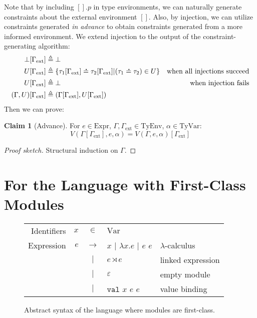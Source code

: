 \documentclass{article}
\theoremstyle{definition}
\newtheorem{clm}{Claim}[section]
\newcommand*{\vbar}{|}
\newcommand*{\A}[1]{\overset{\,_{\mbox{\Large .}}}{#1}}
\newcommand*{\Expr}{\text{Expr}}
\newcommand*{\ExprVar}{\text{Var}}
\newcommand*{\link}[2]{{#1}\rtimes{#2}}
\newcommand*{\Lete}{\mathtt{val}}
\newcommand*{\TyEnv}{\text{TyEnv}}
\newcommand*{\TyVar}{\text{TyVar}}
\newcommand*{\external}{\Gamma_{\text{ext}}}
\begin{document}
Note that by including $[].p$ in type environments, we can naturally generate constraints about the external environment $[]$.
Also, by injection, we can utilize constraints generated \emph{in advance} to obtain constraints generated from a more informed environment.
We extend injection to the output of the constraint-generating algorithm:
\begin{align*}
  \bot[\external]       & \triangleq\bot                                                                                                      \\
  U[\external]          & \triangleq\{\tau_1[\external]\A{=}\tau_2[\external]|(\tau_1\A{=}\tau_2)\in U\} & \text{when all injections succeed} \\
  U[\external]          & \triangleq\bot                                                                 & \text{when injection fails}        \\
  (\Gamma,U)[\external] & \triangleq(\Gamma[\external],U[\external])
\end{align*}
Then we can prove:
\begin{clm}[Advance]
  For $e\in\Expr$, $\Gamma,\external\in\TyEnv$, $\alpha\in\TyVar$:
  \[V(\Gamma[\external],e,\alpha)=V(\Gamma,e,\alpha)[\external]\]
\end{clm}
\begin{proof}[Proof sketch]
  Structural induction on $\Gamma$.
\end{proof}

\section{For the Language with First-Class Modules}
\begin{figure}[htb]
  \centering
  \begin{tabular}{rrcll}
    Identifiers & $x$ & $\in$         & $\ExprVar$                                                     \\
    Expression  & $e$ & $\rightarrow$ & $x$ $\vbar$ $\lambda x.e$ $\vbar$ $e$ $e$ & $\lambda$-calculus \\
                &     & $\vbar$       & $\link{e}{e}$                             & linked expression  \\
                &     & $\vbar$       & $\varepsilon$                             & empty module       \\
                &     & $\vbar$       & $\Lete$ $x$ $e$ $e$                       & value binding
  \end{tabular}
  \caption{Abstract syntax of the language where modules are first-class.}
  \label{fig:extsyntax}
\end{figure}
\end{document}
